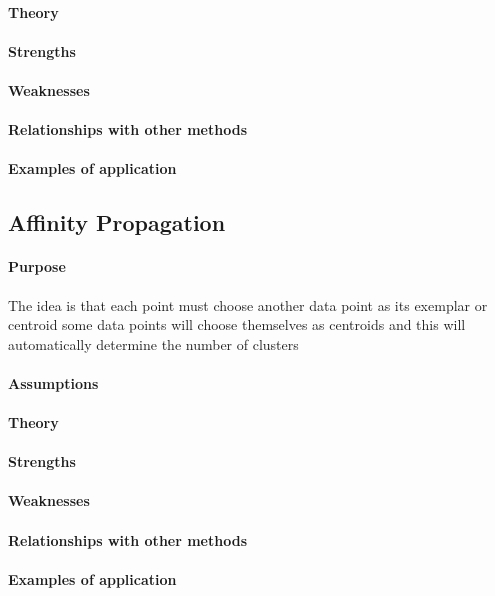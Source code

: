 \paragraph{Theory}
\paragraph{Strengths}
\paragraph{Weaknesses}
\paragraph{Relationships with other methods}
\paragraph{Examples of application}

\subsection{Affinity Propagation}
\paragraph{Purpose}
The idea is that each point must choose another data point as its exemplar or centroid
some data points will choose themselves as centroids and this will automatically determine
the number of clusters 
\paragraph{Assumptions}
\paragraph{Theory}
\paragraph{Strengths}
\paragraph{Weaknesses}
\paragraph{Relationships with other methods}
\paragraph{Examples of application}


